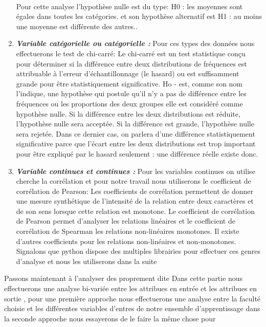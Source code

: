 \begin{enumerate}
	\paragraph{}
	Pour cette analyse l'hypothèse nulle est du type:
	H0 : les moyennes sont égales dans toutes les catégories. 
	et son hypothèse alternatif est 
	H1 : au moins une moyenne est différente des autres..
	\item \emph{\textbf{Variable catégorielle ou catégorielle  :}} 
	Pour ces types des données nous effectuerons le test de chi-carré: Le chi-carré est un test statistique conçu pour déterminer si la différence
	entre deux distributions de fréquences est attribuable à l'erreur
	d'échantillonnage (le hasard) ou est suffisamment grande pour être
	statistiquement significative.
	Ho - est, comme son nom l'indique, une hypothèse qui postule qu'il n'y a pas de différence entre les fréquences ou les proportions des deux groupes elle est considéré comme hypothèse nulle.
	Si la différence entre les deux distributions est réduite, l'hypothèse
	nulle sera acceptée. Si la différence est grande, l'hypothèse nulle sera
	rejetée. Dans ce dernier cas, on parlera d'une différence
	statistiquement significative parce que l'écart entre les deux
	distributions est trop important pour être expliqué par le hasard
	seulement : une différence réelle existe donc.
\item \emph{\textbf{Variable continues et continues  :}} 
Pour les variables continues on utilise cherche la corrélation et pour
notre travail nous utiliserons le coefficient de corrélation de
Pearson: Les coefficients de corrélation permettent de donner une mesure
synthétique de l'intensité de la relation entre deux caractères et de
son sens lorsque cette relation est monotone. Le coefficient de
corrélation de Pearson permet d'analyser les relations linéaires et le
coefficient de corrélation de Spearman les relations non-linéaires
monotones. Il existe d'autres coefficients pour les relations
non-linéaires et non-monotones.
Signalons que python dispose des multiples librairies pour effectuer ces
genres d'analyse et nous les utiliserons dans la suite
\end{enumerate}
Passons maintenant à l'analyser des proprement dite 
 Dans cette partie nous effectuerons une analyse bi-variée
 entre les attribues en entrée et les attribues en sortie , pour une
 première approche nous effectuerons une analyse entre la faculté choisie
 et les différentes variables d'entres de notre ensemble d'apprentissage
 dans la seconde approche nous essayerons de le faire la même chose pour

